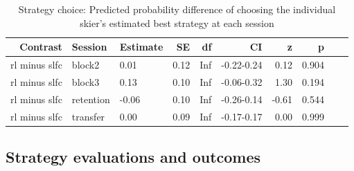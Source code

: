 \documentclass[pdflatex,sn-nature]{sn-jnl}%
\theoremstyle{thmstyleone}%
\theoremstyle{thmstyletwo}%
\theoremstyle{thmstylethree}%
\begin{document}
\begin{appendices}
\begin{table}[h!]
\caption{Strategy choice: Predicted probability difference of choosing the individual skier's estimated best strategy at each session}\label{table_strategychoice_estimatedbest_groupdiff}
\centering
\begin{tabular}{rllrrrrrrl}
  \hline
 Contrast & Session & Estimate & SE & df & CI & z & p \\ 
  \hline
 rl minus slfc & block2 & 0.01 & 0.12 & Inf & -0.22-0.24 & 0.12 &    0.904 \\ 
   rl minus slfc & block3 & 0.13 & 0.10 & Inf & -0.06-0.32 & 1.30 &    0.194 \\ 
   rl minus slfc & retention & -0.06 & 0.10 & Inf & -0.26-0.14 & -0.61 &    0.544 \\ 
  rl minus slfc & transfer & 0.00 & 0.09 & Inf & -0.17-0.17 & 0.00 &    0.999 \\ 
   \hline
\end{tabular}
\end{table}


\subsection{Strategy evaluations and outcomes}


\end{appendices}
\end{document}
